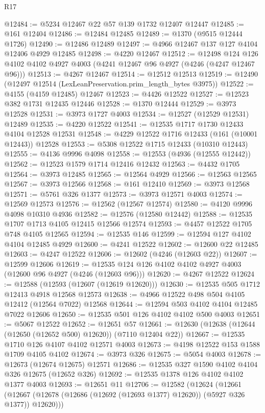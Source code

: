 \begin{lexlean}{R17}
\begin{coremodule}
@12484 := @5234 @12467 @22 @57 @139 @1732 @12407 @12447
@12485 := @161 @12404
@12486 := @12484 @12485
@12489 := @1370 (@9515 @12444 @1726)
@12490 := @12486 @12489
@12497 := @4966 @12467 @137 @127 @4104 @12406 @4929 @12485
@12498 := @4220 @12467
@12512 := @12498
    @124
    @126
    @4102
    @4102
    @4927
    @4003
    (@4241 @12467 @96 @4927 (@4246 (@4247 @12467 @96)))
@12513 := @4267 @12467
@12514 := @12512 @12513
@12519 := @12490 (@12497 @12514 (LexLeanPreservation.prim_length_bytes @3975))
@12522 := @4155 (@4159 @12485) @12467
@12523 := @4426 @12522
@12527 := @12523 @382 @1731 @12435 @12446
@12528 := @1370 @12444
@12529 := @3973 @12528
@12531 := @3973 @1727 @4003
@12534 := @12527 (@12529 @12531) @12489
@12535 := @4220 @12522
@12541 := @12535 @1717 @1730 @12433 @4104 @12528 @12531
@12548 := @4229 @12522 @1716 @12433 (@161 (@10001 @12443)) @12528
@12553 := @5308 @12522 @1715 @12433 (@10310 @12443)
@12555 := @4136 @9996 @4098
@12558 := @12553 (@4936 (@12555 @12442))
@12562 := @12523 @1579 @1714 @12416 @12432
@12563 := @4432 @1705
@12564 := @3973 @12485
@12565 := @12564 @4929
@12566 := @12563 @12565
@12567 := @3973 @12566
@12568 := @161 @12410
@12569 := @3973 @12568
@12571 := @5761 @326 @1377
@12573 := @3973 @12571 @4003
@12574 := @12569 @12573
@12576 := @12562 (@12567 @12574)
@12580 := @4120 @9996 @4098 @10310 @4936
@12582 := @12576 (@12580 @12442)
@12588 := @12535 @1707 @1713 @4105 @12415 @12566 @12574
@12593 := @4457 @12522 @1705 @748 @4105 @12565
@12594 := @12535 @146
@12599 := @12594 @127 @4102 @4104 @12485 @4929
@12600 := @4241 @12522
@12602 := @12600 @22 @12485
@12603 := @4247 @12522
@12606 := @12602 (@4246 (@12603 @22))
@12607 := @12599 @12606
@12619 := @12535 @124 @126 @4102 @4102 @4927 @4003 (@12600 @96 @4927 (@4246 (@12603 @96)))
@12620 := @4267 @12522
@12624 := @12588 (@12593 (@12607 (@12619 @12620)))
@12630 := @12535 @505 @1712 @12413 @4918 @12568 @12573
@12638 := @4966 @12522 @498 @504 @4105 @12412 (@12564 @7022) @12568
@12644 := @12594 @503 @4102 @4104 @12485 @7022 @12606
@12650 := @12535 @501 @126 @4102 @4102 @500 @4003
@12651 := @5067 @12522
@12652 := @12651 @57
@12661 := @12630 (@12638 (@12644 (@12650 (@12652 @500) @12620)) (@7110 @12404 @22))
@12667 := @12535 @1710 @126 @4107 @4102 @12571 @4003
@12673 := @4198 @12522 @153 @1588 @1709 @4105 @4102
@12674 := @3973 @326
@12675 := @5054 @4003
@12678 := @12673 (@12674 @12675) @12571
@12686 := @12535 @327 @1590 @4102 @4104 @326 @12675 (@12652 @326)
@12692 := @12535 @1378 @126 @4102 @4102 @1377 @4003
@12693 := @12651 @11
@12706 := @12582
    (@12624
      (@12661 (@12667 (@12678 (@12686 (@12692 (@12693 @1377) @12620)) (@5927 @326 @1377)) @12620)))

\end{coremodule}
\end{lexlean}
